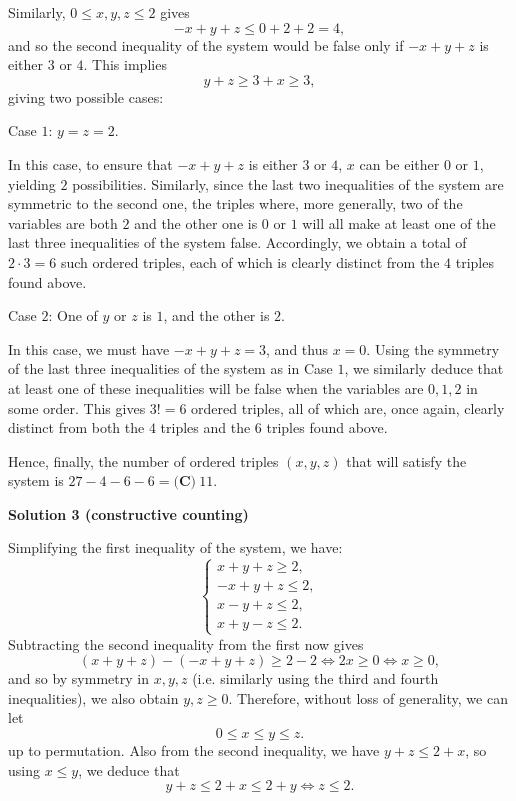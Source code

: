 \begin{enumerate}
 Similarly, $0 \leq x,y,z \leq 2$ gives 
 \[-x+y+z \leq 0+2+2 = 4,\] and so the second inequality of the system would be false only if $-x+y+z$ is either $3$ or $4$. This implies 
 \[y+z \geq 3+x \geq 3,\] giving two possible cases: 

 Case $1$: $y = z = 2$.

 In this case, to ensure that $-x+y+z$ is either $3$ or $4$, $x$ can be either $0$ or $1$, yielding $2$ possibilities. Similarly, since the last two inequalities of the system are symmetric to the second one, the triples where, more generally, two of the variables are both $2$ and the other one is $0$ or $1$ will all make at least one of the last three inequalities of the system false. Accordingly, we obtain a total of $2 \cdot 3 = 6$ such ordered triples, each of which is clearly distinct from the $4$ triples found above.

 Case $2$: One of $y$ or $z$ is $1$, and the other is $2$.

 In this case, we must have $-x+y+z = 3$, and thus $x = 0$. Using the symmetry of the last three inequalities of the system as in Case $1$, we similarly deduce that at least one of these inequalities will be false when the variables are $0,1,2$ in some order. This gives $3! = 6$ ordered triples, all of which are, once again, clearly distinct from both the $4$ triples and the $6$ triples found above.

 
Hence, finally, the number of ordered triples $(x,y,z)$ that will satisfy the system is $27-4-6-6 = \boxed{\textbf{(C)}\ 11}$.

 



\textbf{Solution 3 (constructive counting)}

Simplifying the first inequality of the system, we have:
 \[\begin{cases} x+y+z \geq 2, \\ -x+y+z \leq 2, \\ x-y+z \leq 2, \\ x+y-z \leq 2. \end{cases}\]Subtracting the second inequality from the first now gives
 \[(x+y+z)-(-x+y+z) \geq 2-2 \iff 2x \geq 0 \iff x \geq 0,\] and so by symmetry in $x,y,z$ (i.e. similarly using the third and fourth inequalities), we also obtain $y,z \geq 0$. Therefore, without loss of generality, we can let
 \[0 \leq x \leq y \leq z.\]up to permutation. Also from the second inequality, we have $y+z \leq 2+x$, so using $x \leq y$, we deduce that
 \[y+z \leq 2+x \leq 2+y \iff z \leq 2.\]


\end{enumerate}
